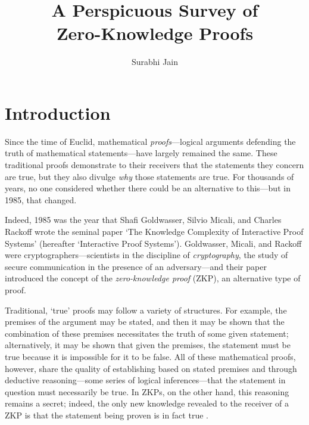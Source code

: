 \documentclass{article}
\title{\textbf{A Perspicuous Survey of \\ Zero-Knowledge Proofs}}
\author{Surabhi Jain}
\date{}
\begin{document}
\maketitle


\section{Introduction}

Since the time of Euclid, mathematical \textit{proofs}---logical arguments defending the truth of mathematical statements---have largely remained the same. These traditional proofs demonstrate to their receivers that the statements they concern are true, but they also divulge \textit{why} those statements are true. For thousands of years, no one considered whether there could be an alternative to this---but in 1985, that changed.

Indeed, 1985 was the year that Shafi Goldwasser, Silvio Micali, and Charles Rackoff wrote the seminal paper `The Knowledge Complexity of Interactive Proof Systems' (hereafter `Interactive Proof Systems'). Goldwasser, Micali, and Rackoff were cryptographers---scientists in the discipline of \textit{cryptography}, the study of secure communication in the presence of an adversary---and their paper introduced the concept of the \textit{zero-knowledge proof} (ZKP), an alternative type of proof.

Traditional, `true' proofs may follow a variety of structures. For example, the premises of the argument may be stated, and then it may be shown that the combination of these premises necessitates the truth of some given statement; alternatively, it may be shown that given the premises, the statement must be true because it is impossible for it to be false. All of these mathematical proofs, however, share the quality of establishing based on stated premises and through deductive reasoning---some series of logical inferences---that the statement in question must necessarily be true. In ZKPs, on the other hand, this reasoning remains a secret; indeed, the only new knowledge revealed to the receiver of a ZKP is that the statement being proven is in fact true \cite{GMR}.
\end{document}
